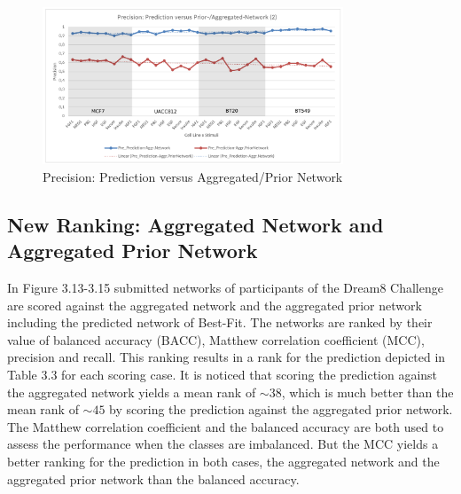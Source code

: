 \begin{figure}[H]
\captionsetup{width=0.8\linewidth}
\centering
\includegraphics[width=0.8\textwidth]{./Bilder/Scoring/dreamchallenge/1_Balanced_vs_Unbalanced/balanced_rec_prec2.pdf}
\caption[Precision: Prediction versus Aggregated/Prior Network]{Precision: Prediction versus Aggregated/Prior Network}
\label{fig:10}
\end{figure}
\newpage
\subsection*{New Ranking: Aggregated Network and Aggregated Prior Network}

In Figure 3.13-3.15 submitted networks of participants of the Dream8 Challenge are scored against the aggregated network and the aggregated prior network including the predicted network of Best-Fit. The networks are ranked by their value of balanced accuracy (BACC), Matthew correlation coefficient (MCC), precision and recall. This ranking results in a rank for the prediction depicted in Table 3.3 for each scoring case. It is noticed that scoring the prediction against the aggregated network yields a mean rank of $\sim 38$, which is much better than the mean rank of $\sim 45$ by scoring the prediction against the aggregated prior network. \\

The Matthew correlation coefficient and the balanced accuracy are both used to assess the performance when the classes are imbalanced. But the MCC yields a better ranking for the prediction in both cases, the aggregated network and the aggregated prior network than the balanced accuracy. 



